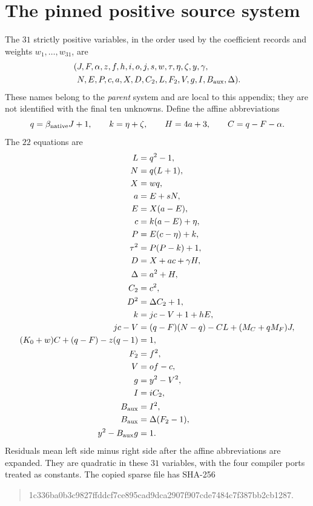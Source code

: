 \documentclass[11pt,a4paper]{article}
\theoremstyle{remark}
\begin{document}
\clearpage
\appendix
\section{The pinned positive source system}\label{app:parent}
The \(31\) strictly positive variables, in the order used by the
coefficient records and weights \(w_1,\ldots,w_{31}\), are
\[
\begin{split}
(&J,F,\alpha,z,f,h,i,o,j,s,w,\tau,\eta,\zeta,y,\gamma,\\
 &N,E,P,c,a,X,D,C_2,L,F_2,V,g,I,B_{\rm aux},\Delta).
\end{split}
\]
These names belong to the \emph{parent} system and are local to
this appendix; they are not identified with the final ten
unknowns. Define the affine abbreviations
\[
q=\beta_{\rm native}J+1,\qquad k=\eta+\zeta,\qquad
H=4a+3,\qquad C=q-F-\alpha.
\]
The \(22\) equations are
\begin{align*}
L&=q^2-1,\\
N&=q(L+1),\\
X&=wq,\\
a&=E+sN,\\
E&=X(a-E),\\
c&=k(a-E)+\eta,\\
P&=E(c-\eta)+k,\\
\tau^2&=P(P-k)+1,\\
D&=X+ac+\gamma H,\\
\Delta&=a^2+H,\\
C_2&=c^2,\\
D^2&=\Delta C_2+1,\\
k&=jc-V+1+hE,\\
jc-V&=(q-F)(N-q)-CL+(M_C+qM_F)J,\\
(K_0+w)C+(q-F)-z(q-1)&=1,\\
F_2&=f^2,\\
V&=of-c,\\
g&=y^2-V^2,\\
I&=iC_2,\\
B_{\rm aux}&=I^2,\\
B_{\rm aux}&=\Delta(F_2-1),\\
y^2-B_{\rm aux}g&=1.
\end{align*}
Residuals mean left side minus right side after the affine
abbreviations are expanded. They are quadratic in these \(31\)
variables, with the four compiler ports treated as constants.
The copied sparse file has SHA-256
\begin{quote}\small\ttfamily
1c336ba0b3c9827ffddcf7ce895cad9dca2907f907cde7484c7f387bb2cb1287.
\end{quote}
\end{document}
